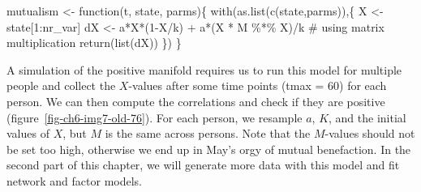 \documentclass[
  a4paper,
  DIV=11,
  numbers=noendperiod,
  oneside]{scrreprt}
\newenvironment{Shaded}{}{}
\newcommand{\CommentTok}[1]{\textcolor[rgb]{0.42,0.45,0.49}{#1}}
\newcommand{\ControlFlowTok}[1]{\textcolor[rgb]{0.84,0.23,0.29}{#1}}
\newcommand{\DecValTok}[1]{\textcolor[rgb]{0.00,0.36,0.77}{#1}}
\newcommand{\FunctionTok}[1]{\textcolor[rgb]{0.44,0.26,0.76}{#1}}
\newcommand{\NormalTok}[1]{\textcolor[rgb]{0.14,0.16,0.18}{#1}}
\newcommand{\OtherTok}[1]{\textcolor[rgb]{0.44,0.26,0.76}{#1}}
\newcommand{\SpecialCharTok}[1]{\textcolor[rgb]{0.00,0.36,0.77}{#1}}
\begin{document}
\begin{Shaded}
\begin{Highlighting}[]
\NormalTok{mutualism }\OtherTok{\textless{}{-}} \ControlFlowTok{function}\NormalTok{(t, state, parms)\{}
  \FunctionTok{with}\NormalTok{(}\FunctionTok{as.list}\NormalTok{(}\FunctionTok{c}\NormalTok{(state,parms)),\{}
\NormalTok{    X }\OtherTok{\textless{}{-}}\NormalTok{ state[}\DecValTok{1}\SpecialCharTok{:}\NormalTok{nr\_var]}
\NormalTok{    dX }\OtherTok{\textless{}{-}}\NormalTok{ a}\SpecialCharTok{*}\NormalTok{X}\SpecialCharTok{*}\NormalTok{(}\DecValTok{1}\SpecialCharTok{{-}}\NormalTok{X}\SpecialCharTok{/}\NormalTok{k) }\SpecialCharTok{+}\NormalTok{ a}\SpecialCharTok{*}\NormalTok{(X }\SpecialCharTok{*}\NormalTok{ M }\SpecialCharTok{\%*\%}\NormalTok{ X)}\SpecialCharTok{/}\NormalTok{k }\CommentTok{\# using matrix multiplication}
    \FunctionTok{return}\NormalTok{(}\FunctionTok{list}\NormalTok{(dX))}
\NormalTok{  \})}
\NormalTok{\}}
\end{Highlighting}
\end{Shaded}

A simulation of the positive manifold requires us to run this model for
multiple people and collect the \(X\)-values after some time points
(tmax = 60) for each person. We can then compute the correlations and
check if they are positive (figure~\ref{fig-ch6-img7-old-76}). For each
person, we resample \(a\), \(K\), and the initial values of \(X\), but
\(M\) is the same across persons. Note that the \(M\)-values should not
be set too high, otherwise we end up in May's orgy of mutual
benefaction. In the second part of this chapter, we will generate more
data with this model and fit network and factor models.
\end{document}
